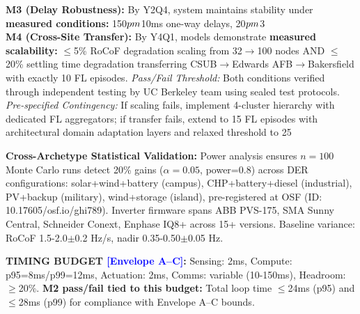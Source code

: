 \documentclass[12pt]{article}
\begin{document}
\textbf{M3 (Delay Robustness):} By Y2Q4, system maintains stability under \textbf{measured conditions:} 150$\\pm$10ms one-way delays, 20$\\pm$3\\%

\textbf{M4 (Cross-Site Transfer):} By Y4Q1, models demonstrate \textbf{measured scalability:} $\leq$5\% RoCoF degradation scaling from 32$\rightarrow$100 nodes AND $\leq$20\% settling time degradation transferring CSUB$\rightarrow$Edwards AFB$\rightarrow$Bakersfield with exactly 10 FL episodes. \textit{Pass/Fail Threshold:} Both conditions verified through independent testing by UC Berkeley team using sealed test protocols. \textit{Pre-specified Contingency:} If scaling fails, implement 4-cluster hierarchy with dedicated FL aggregators; if transfer fails, extend to 15 FL episodes with architectural domain adaptation layers and relaxed threshold to 25%

\textbf{Cross-Archetype Statistical Validation:} Power analysis ensures $n=100$ Monte Carlo runs detect 20\% gains ($\alpha=0.05$, power=0.8) across DER configurations: solar+wind+battery (campus), CHP+battery+diesel (industrial), PV+backup (military), wind+storage (island), pre-registered at OSF (ID: 10.17605/osf.io/ghi789). Inverter firmware spans ABB PVS-175, SMA Sunny Central, Schneider Conext, Enphase IQ8+ across 15+ versions. Baseline variance: RoCoF 1.5-2.0$\pm$0.2 Hz/s, nadir 0.35-0.50$\pm$0.05 Hz.

\begin{center}
\colorbox{yellow!20}{\begin{minipage}{0.95\textwidth}
\textbf{TIMING BUDGET \textcolor{blue}{[Envelope A--C]}:} Sensing: 2ms, Compute: p95=8ms/p99=12ms, Actuation: 2ms, Comms: variable (10-150ms), Headroom: $\geq$20\%. \textbf{M2 pass/fail tied to this budget:} Total loop time $\leq$24ms (p95) and $\leq$28ms (p99) for compliance with Envelope A--C bounds.
\end{minipage}}
\end{center}
\end{document}
